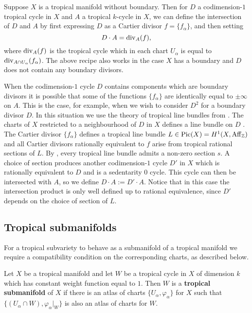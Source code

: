 Suppose  $X$ is a tropical manifold without boundary. 
Then for $D$ a codimension-$1$ tropical cycle in $X$ and $A$ a tropical $k$-cycle in $X$, we can define the intersection of $D$ and $A$ by first expressing $D$ as a Cartier divisor $f = \{ f_{\alpha}\}$, and then setting
$$D \cdot A = \operatorname{div}_A( f ),$$
where $\operatorname{div}_A(f)$ is the tropical cycle which in each chart $U_{\alpha}$ is equal to $\operatorname{div}_{A \cap U_{\alpha}}(f_{\alpha})$. 
The above recipe also works in the case $X$ has a boundary and $D$ does not contain any boundary divisors. 


When the codimension-$1$ cycle $D$ contains components which are boundary divisors it is possible that some of the functions $\{f_{\alpha}\}$ are identically equal to $\pm \infty$  on $A$. This is the case, for example, when we wish to consider $D^2$ for a boundary divisor $D$. In this situation we use the theory of tropical line bundles from \cite{JRS}. The charts of $X$ restricted to a neighbourhood of $D$ in $X$ defines a line bundle on $D$ \cite{ShawThesis}. 
The Cartier divisor $\{f_{\alpha}\}$ defines a tropical line bundle $L \in \operatorname{Pic}(X) = H^1(X, \operatorname{Aff}_{\mathbb{Z}})$ and 
all Cartier divisors rationally equivalent to $f$ arise from tropical rational sections of $L$. By \cite[Proposition 4.6]{JRS}, every tropical line bundle admits a non-zero section $s$. A choice of section produces another codimension-$1$ cycle $D'$ in $X$ which is rationally equivalent to $D$ and is a sedentarity $0$ cycle. This cycle can then be intersected with $A$, so we define $D \cdot A := D' \cdot A$.
Notice that in this case the intersection product is only well defined up to rational equivalence, since $D'$ depends on the choice of section of $L$. 
 



\subsection{Tropical submanifolds}
\label{sec:submanifolds}
For a tropical subvariety to behave as a submanifold of a tropical manifold we require a compatibility condition on the corresponding charts, as described below.

\begin{defi}\label{def:submanifold}
Let $X$ be a tropical manifold and let $W$ be a tropical cycle in $X$ of dimension $k$ which has constant weight function equal to $1$. 
Then $W$ is a {\bf tropical submanifold} of $X$ if 
there is an atlas of charts $\{U_{\alpha}, \varphi_{\alpha}\}$ for $X$ 
such that $\{(U_{\alpha} \cap W), \varphi_{\alpha}|_W\}$ is also an atlas of charts for $W$. 
\end{defi}

